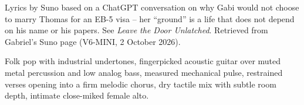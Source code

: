 
\begin{notes}
Lyrics by Suno based on a ChatGPT conversation on why Gabi would not choose to marry Thomas for an EB-5 visa -- her “ground” is a life that does not depend on his name or his papers. See \emph{Leave the Door Unlatched}. Retrieved from Gabriel’s Suno page (V6-MINI, 2 October 2026).
\end{notes}
\begin{style}
Folk pop with industrial undertones, fingerpicked acoustic guitar over muted metal percussion and low analog bass, measured mechanical pulse, restrained verses opening into a firm melodic chorus, dry tactile mix with subtle room depth, intimate close-miked female alto.
\end{style}
